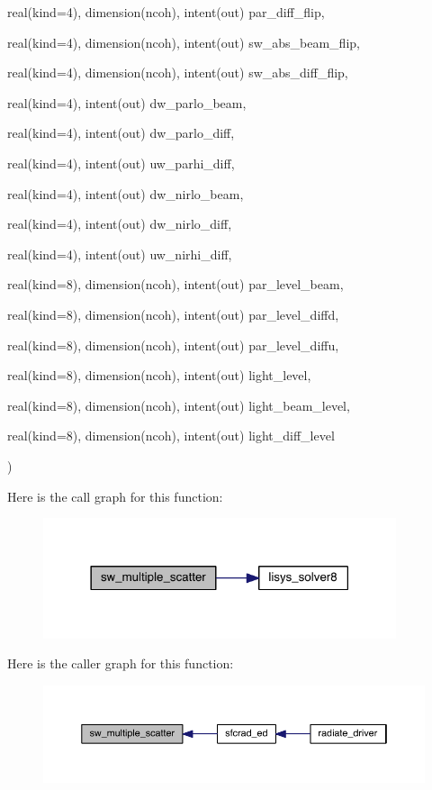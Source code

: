 {\begin{DoxyParamCaption}
\item[{real(kind=4), dimension(ncoh), intent(out)}]{par\+\_\+diff\+\_\+flip, }
\item[{real(kind=4), dimension(ncoh), intent(out)}]{sw\+\_\+abs\+\_\+beam\+\_\+flip, }
\item[{real(kind=4), dimension(ncoh), intent(out)}]{sw\+\_\+abs\+\_\+diff\+\_\+flip, }
\item[{real(kind=4), intent(out)}]{dw\+\_\+parlo\+\_\+beam, }
\item[{real(kind=4), intent(out)}]{dw\+\_\+parlo\+\_\+diff, }
\item[{real(kind=4), intent(out)}]{uw\+\_\+parhi\+\_\+diff, }
\item[{real(kind=4), intent(out)}]{dw\+\_\+nirlo\+\_\+beam, }
\item[{real(kind=4), intent(out)}]{dw\+\_\+nirlo\+\_\+diff, }
\item[{real(kind=4), intent(out)}]{uw\+\_\+nirhi\+\_\+diff, }
\item[{real(kind=8), dimension(ncoh), intent(out)}]{par\+\_\+level\+\_\+beam, }
\item[{real(kind=8), dimension(ncoh), intent(out)}]{par\+\_\+level\+\_\+diffd, }
\item[{real(kind=8), dimension(ncoh), intent(out)}]{par\+\_\+level\+\_\+diffu, }
\item[{real(kind=8), dimension(ncoh), intent(out)}]{light\+\_\+level, }
\item[{real(kind=8), dimension(ncoh), intent(out)}]{light\+\_\+beam\+\_\+level, }
\item[{real(kind=8), dimension(ncoh), intent(out)}]{light\+\_\+diff\+\_\+level}
\end{DoxyParamCaption}
)}\label{multiple__scatter_8f90_a2a48cb88f4cbc8013f2b09b2fc878d1b}


Here is the call graph for this function\+:\nopagebreak
\begin{figure}[H]
\begin{center}
\leavevmode
\includegraphics[width=294pt]{multiple__scatter_8f90_a2a48cb88f4cbc8013f2b09b2fc878d1b_cgraph}
\end{center}
\end{figure}




Here is the caller graph for this function\+:\nopagebreak
\begin{figure}[H]
\begin{center}
\leavevmode
\includegraphics[width=350pt]{multiple__scatter_8f90_a2a48cb88f4cbc8013f2b09b2fc878d1b_icgraph}
\end{center}
\end{figure}


